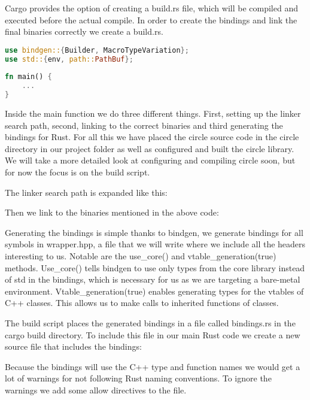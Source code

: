 Cargo provides the option of creating a build.rs file, which will be compiled and executed before the actual compile.
In order to create the bindings and link the final binaries correctly we create a build.rs.
\begin{lstlisting}[language=Rust,style=colouredRust]
use bindgen::{Builder, MacroTypeVariation};
use std::{env, path::PathBuf};
    
fn main() {
    ...
}    
\end{lstlisting}

Inside the main function we do three different things.
First, setting up the linker search path, second, linking to the correct binaries and third generating the bindings for Rust.
For all this we have placed the circle source code in the circle directory in our project folder as well as configured and built the circle library.
We will take a more detailed look at configuring and compiling circle soon, but for now the focus is on the build script.

The linker search path is expanded like this:


Then we link to the binaries mentioned in the above code:


Generating the bindings is simple thanks to bindgen, we generate bindings for all symbols in wrapper.hpp,
a file that we will write where we include all the headers interesting to us.
Notable are the use\_core() and vtable\_generation(true) methods.
Use\_core() tells bindgen to use only types from the core library instead of std in the bindings, which is necessary for us as we are targeting a bare-metal environment.
Vtable\_generation(true) enables generating types for the vtables of C++ classes.
This allows us to make calls to inherited functions of classes.


The build script places the generated bindings in a file called bindings.rs in the cargo build directory.
To include this file in our main Rust code we create a new source file that includes the bindings:


Because the bindings will use the C++ type and function names we would get a lot of warnings for not following Rust naming conventions.
To ignore the warnings we add some allow directives to the file.

